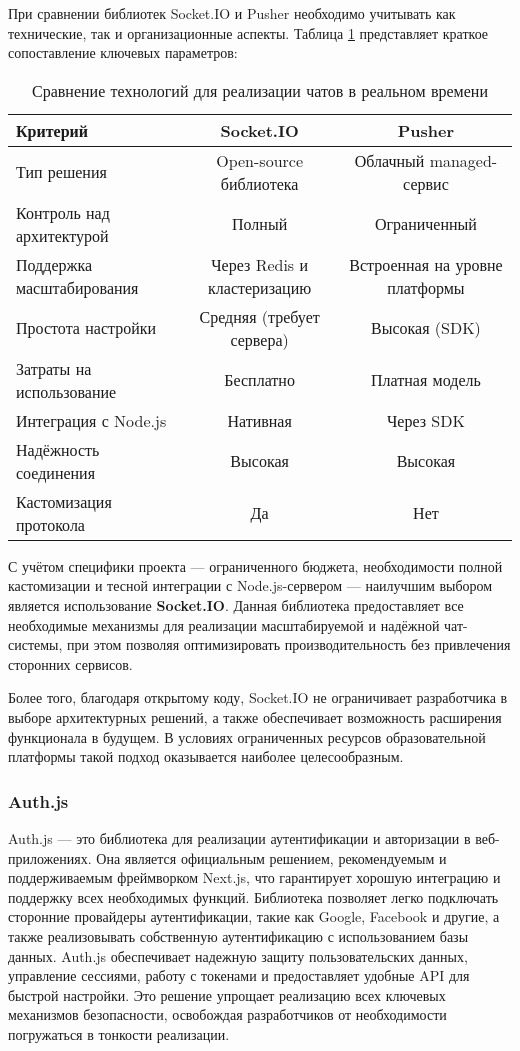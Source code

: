 При сравнении библиотек Socket.IO и Pusher необходимо учитывать как технические, так и организационные аспекты. Таблица \ref{tab:chat-comparison} представляет краткое сопоставление ключевых параметров:

\begin{table}[h]
\centering
\caption{Сравнение технологий для реализации чатов в реальном времени}
\small
\label{tab:chat-comparison}
\begin{tabular}{|l|c|c|}
\hline
\textbf{Критерий} & \textbf{Socket.IO} & \textbf{Pusher} \\ \hline
Тип решения & Open-source библиотека & Облачный managed-сервис \\ \hline
Контроль над архитектурой & Полный & Ограниченный \\ \hline
Поддержка масштабирования & Через Redis и кластеризацию & Встроенная на уровне платформы \\ \hline
Простота настройки & Средняя (требует сервера) & Высокая (SDK) \\ \hline
Затраты на использование & Бесплатно & Платная модель \\ \hline
Интеграция с Node.js & Нативная & Через SDK \\ \hline
Надёжность соединения & Высокая & Высокая \\ \hline
Кастомизация протокола & Да & Нет \\ \hline
\end{tabular}
\end{table}

С учётом специфики проекта --- ограниченного бюджета, необходимости полной кастомизации и тесной интеграции с Node.js-сервером --- наилучшим выбором является использование \textbf{Socket.IO}. Данная библиотека предоставляет все необходимые механизмы для реализации масштабируемой и надёжной чат-системы, при этом позволяя оптимизировать производительность без привлечения сторонних сервисов.

Более того, благодаря открытому коду, Socket.IO не ограничивает разработчика в выборе архитектурных решений, а также обеспечивает возможность расширения функционала в будущем. В условиях ограниченных ресурсов образовательной платформы такой подход оказывается наиболее целесообразным.

\subsubsection*{Auth.js}
Auth.js --- это библиотека для реализации аутентификации и авторизации в веб-приложениях. Она является официальным решением, рекомендуемым и поддерживаемым фреймворком Next.js, что гарантирует хорошую интеграцию и поддержку всех необходимых функций. Библиотека позволяет легко подключать сторонние провайдеры аутентификации, такие как Google, Facebook и другие, а также реализовывать собственную аутентификацию с использованием базы данных. Auth.js обеспечивает надежную защиту пользовательских данных, управление сессиями, работу с токенами и предоставляет удобные API для быстрой настройки. Это решение упрощает реализацию всех ключевых механизмов безопасности, освобождая разработчиков от необходимости погружаться в тонкости реализации.

